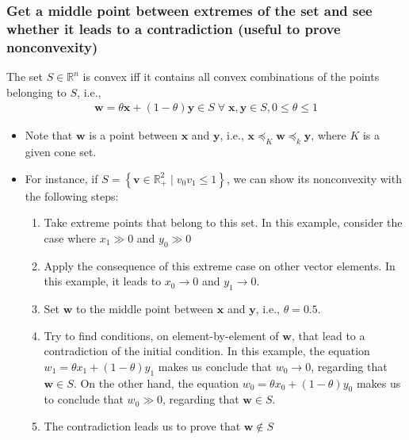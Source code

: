 \documentclass{article}
\begin{document}
\subsubsection{Get a middle point between extremes of the set and see whether it leads to a contradiction (useful to prove nonconvexity)}
The set \(S \in \mathbb{R}^{n}\) is convex iff it contains all convex combinations of the points belonging to \(S\), i.e.,
\begin{align}
    \mathbf{w} = \theta \mathbf{x} + (1-\theta)\mathbf{y} \in S \;\forall\; \mathbf{x}, \mathbf{y} \in S, 0\leq\theta\leq 1
\end{align}
\begin{itemize}
    \item Note that \(\mathbf{w}\) is a point between \(\mathbf{x}\) and \(\mathbf{y}\), i.e., \(\mathbf{x} \preceq_K \mathbf{w} \preceq_k \mathbf{y}\), where \(K\) is a given cone set.
    \item For instance, if \(S = \left\{ \mathbf{v} \in \mathbb{R}_{+}^{2} \mid v_0v_1 \leq 1 \right\}\), we can show its nonconvexity with the following steps:
    \begin{enumerate}
        \item Take extreme points that belong to this set. In this example, consider the case where \(x_1 \gg 0\) and \(y_0 \gg 0\)
        \item Apply the consequence of this extreme case on other vector elements. In this example, it leads to \(x_0 \rightarrow 0\) and \(y_1 \rightarrow 0\).
        \item Set \(\mathbf{w}\) to the middle point between \(\mathbf{x}\) and \(\mathbf{y}\), i.e., \(\theta = 0.5\).
        \item Try to find conditions, on element-by-element of \(\mathbf{w}\), that lead to a contradiction of the initial condition. In this example, the equation \(w_1 = \theta x_1 + (1-\theta)y_1\) makes us conclude that \(w_0 \rightarrow 0\), regarding that \(\mathbf{w} \in S\). On the other hand, the equation \(w_0 = \theta x_0 + (1-\theta)y_0\) makes us to conclude that \(w_0 \gg 0\), regarding that \(\mathbf{w} \in S\).
        \item The contradiction leads us to prove that \(\mathbf{w} \not\in S\)
    \end{enumerate}
\end{itemize}
\end{document}
